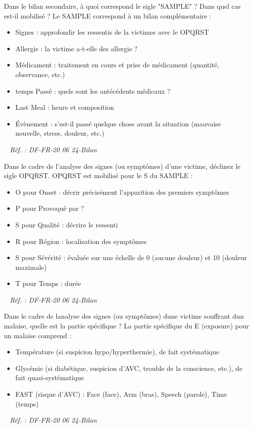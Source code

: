 \documentclass[grid,avery5371,landscape]{flashcards}
\makeatletter
\newcounter{nocarte}
\newcommand{\categ}[1]{%
  \def\@categ{#1}%
  \setcounter{nocarte}{0}%
}
\newcommand{\source}[1]{%
  \medskip
  \itshape%
   ~ \hfill Réf. : #1}
\makeatother
\begin{document}
\color[HTML]{003273}
\categ{PSE}
\begin{flashcard}[bilan]{
 Dans le bilan secondaire, à quoi correspond le sigle "SAMPLE" ? Dans quel cas est-il mobilisé ?   }
  Le SAMPLE correspond à un bilan complémentaire  : 
\begin{itemize} 
\item Signes : approfondir les ressentis de la victimes avec le OPQRST
\item Allergie : la victime a-t-elle des allergie ?
\item Médicament : traitement en cours et prise de médicament (quantité, observance, etc.)
\item temps Passé : quels sont les antécédents médicaux ?
\item Last Meal : heure et composition
\item Évènement : s'est-il passé quelque chose avant la situation (mauvaise nouvelle, stress, douleur, etc.)
\end{itemize}
  \source{DF-FR-20 06 24-Bilan}
\end{flashcard}


\color[HTML]{003273}
\categ{PSE}
\begin{flashcard}[bilan]{
 Dans le cadre de l'analyse des signes (ou symptômes) d'une victime, déclinez le sigle OPQRST.   }
  OPQRST est mobilisé pour le S du SAMPLE : \begin{itemize} 
\item O pour Onset : décrir précisément l'apparition des premiers symptômes
\item P pour Provoqué par ?
\item S pour Qualité : décrire le ressenti
\item R pour Région : localisation des symptômes
\item S pour Sévérité : évaluée sur une échelle de 0 (aucune douleur) et 10 (douleur maximale)
\item T pour Temps : durée
\end{itemize}

  \source{DF-FR-20 06 24-Bilan}
\end{flashcard}


\color[HTML]{003273}
\categ{PSE}
\begin{flashcard}[bilan]{
 Dans le cadre de lanalyse des signes (ou symptômes) dune victime souffrant dun malaise, quelle est la partie spécifique ?   }
  La partie spécifique du E (exposure) pour un malaise comprend : 
\begin{itemize} 
\item Température (si suspicion hypo/hyperthermie), de fait systématique
\item Glycémie (si diabétique, suspicion d'AVC, trouble de la conscience, etc.), de fait quasi-systématique
\item FAST (risque d'AVC) : Face (face), Arm (bras), Speech (parole), Time (temps)
\end{itemize}

  \source{DF-FR-20 06 24-Bilan}
\end{flashcard}
\end{document}

